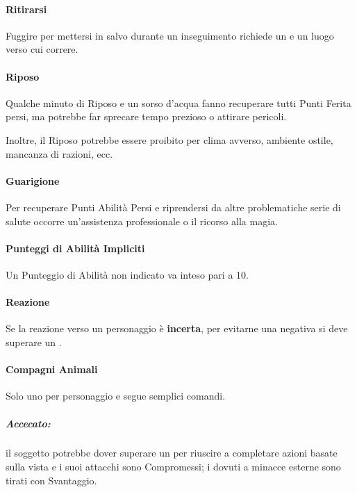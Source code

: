 \documentclass[itdr]{subfiles}
\begin{document}
\vfill
\paragraph{Ritirarsi}
Fuggire per mettersi in salvo durante un inseguimento richiede un  e un luogo verso cui correre.

\vfill
\paragraph{Riposo}
Qualche minuto di Riposo e un sorso d’acqua fanno recuperare tutti Punti Ferita persi, ma potrebbe far sprecare tempo prezioso o attirare pericoli.

Inoltre, il Riposo potrebbe essere proibito per clima avverso, ambiente ostile, mancanza di razioni, ecc.

\vfill
\paragraph{Guarigione}
Per recuperare Punti Abilità Persi e riprendersi da altre problematiche serie di salute occorre un'assistenza professionale o il ricorso alla magia.

\vfill
\paragraph{Punteggi di Abilità Impliciti}
Un Punteggio di Abilità non indicato va inteso pari a 10.

\vfill
\paragraph{Reazione}
Se la reazione verso un personaggio è \textbf{incerta}, per evitarne una negativa si deve superare un .

\vfill
\paragraph{Compagni Animali}
Solo uno per personaggio e segue semplici comandi.

\vfill
{}

\subparagraph{Accecato:} il soggetto potrebbe dover superare un  per riuscire a completare azioni basate sulla vista e i suoi attacchi sono Compromessi; i  dovuti a minacce esterne sono tirati con Svantaggio.
\end{document}
